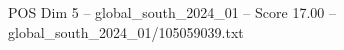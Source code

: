 \begin{textsample}{POS Dim 5 – global\_south\_2024\_01 – Score 17.00 – global\_south\_2024\_01/105059039.txt}
\end{textsample}
